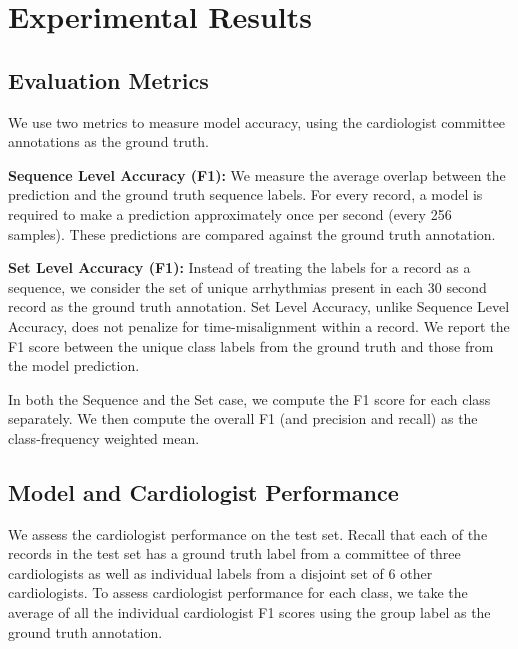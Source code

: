 \section{Experimental Results}

\subsection*{Evaluation Metrics}
We use two metrics to measure model accuracy, using the cardiologist committee
annotations as the ground truth.

\textbf{Sequence Level Accuracy (F1):} We measure the average overlap between
the prediction and the ground truth sequence labels. For every record, a model
is required to make a prediction approximately once per second (every 256
samples). These predictions are compared against the ground truth annotation.

\textbf{Set Level Accuracy (F1):} Instead of treating the labels for a record
as a sequence, we consider the set of unique arrhythmias present in each 30
second record as the ground truth annotation. Set Level Accuracy, unlike
Sequence Level Accuracy, does not penalize for time-misalignment within a
record. We report the F1 score between the unique class labels from the ground
truth and those from the model prediction.

In both the Sequence and the Set case, we compute the F1 score for each class
separately. We then compute the overall F1 (and precision and recall) as the
class-frequency weighted mean.

\subsection*{Model and Cardiologist Performance}

We assess the cardiologist performance on the test set. Recall that each of the
records in the test set has a ground truth label from a committee of three
cardiologists as well as individual labels from a disjoint set of 6 other
cardiologists. To assess cardiologist performance for each class, we take the
average of all the individual cardiologist F1 scores using the group label as
the ground truth annotation.

